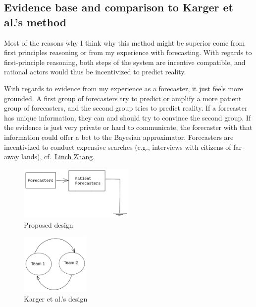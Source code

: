 \documentclass[]{article}
\begin{document}
\hypertarget{evidence-base-and-comparison-to-karger-et-al.s-method}{%
\subsection{Evidence base and comparison to Karger et al.'s
method}\label{evidence-base-and-comparison-to-karger-et-al.s-method}}

Most of the reasons why I think why this method might be superior come
from first principles reasoning or from my experience with forecasting.
With regards to first-principle reasoning, both steps of the system are
incentive compatible, and rational actors would thus be incentivized to
predict reality.

With regards to evidence from my experience as a forecaster, it just
feels more grounded. A first group of forecasters try to predict or
amplify a more patient group of forecasters, and the second group tries
to predict reality. If a forecaster has unique information, they can and
should try to convince the second group. If the evidence is just very
private or hard to communicate, the forecaster with that information
could offer a bet to the Bayesian approximator. Forecasters are
incentivized to conduct expensive searches (e.g., interviews with
citizens of far-away lands),
cf.~\href{https://twitter.com/LinchZhang/status/1455759586158268417}{Linch
Zhang}.

\begin{figure}
\centering
\includegraphics[width=0.5\textwidth,height=\textheight]{diagrams/amplify-samotsvety-1.png}
\caption{Proposed design}
\end{figure}

\begin{figure}
\centering
\includegraphics[width=0.3\textwidth,height=\textheight]{diagrams/karger-method.png}
\caption{Karger et al.'s design}
\end{figure}
\end{document}
